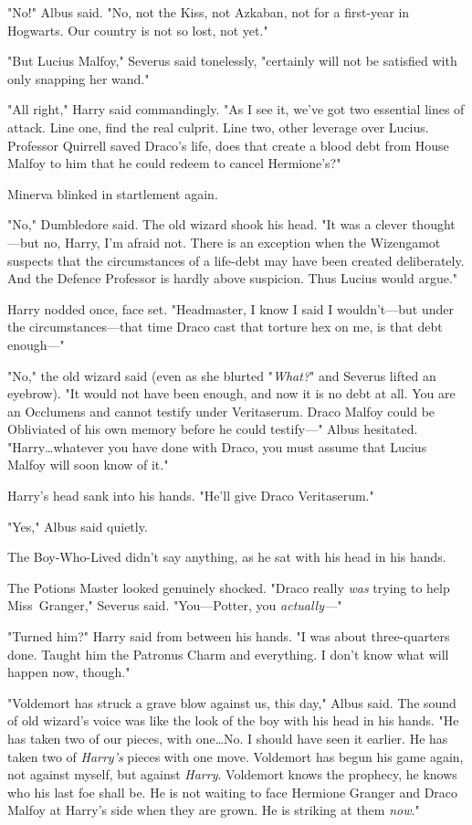 "No!" Albus said. "No, not the Kiss, not Azkaban, not for a first-year in
Hogwarts. Our country is not so lost, not yet."

"But Lucius Malfoy," Severus said tonelessly, "certainly will not be satisfied
with only snapping her wand."

"All right," Harry said commandingly. "As I see it, we've got two essential
lines of attack. Line one, find the real culprit. Line two, other leverage over
Lucius. Professor Quirrell saved Draco's life, does that create a blood debt
from House Malfoy to him that he could redeem to cancel Hermione's?"

Minerva blinked in startlement again.

"No," Dumbledore said. The old wizard shook his head. "It was a clever
thought—but no, Harry, I'm afraid not. There is an exception when the
Wizengamot suspects that the circumstances of a life-debt may have been created
deliberately. And the Defence Professor is hardly above suspicion. Thus Lucius
would argue."

Harry nodded once, face set. "Headmaster, I know I said I wouldn't—but under
the circumstances—that time Draco cast that torture hex on me, is that debt
enough—"

"No," the old wizard said (even as she blurted "\emph{What?}" and Severus
lifted an eyebrow). "It would not have been enough, and now it is no debt at
all. You are an Occlumens and cannot testify under Veritaserum. Draco Malfoy
could be Obliviated of his own memory before he could testify—" Albus
hesitated. "Harry…whatever you have done with Draco, you must assume
that Lucius Malfoy will soon know of it."

Harry's head sank into his hands. "He'll give Draco Veritaserum."

"Yes," Albus said quietly.

The Boy-Who-Lived didn't say anything, as he sat with his head in his hands.

The Potions Master looked genuinely shocked. "Draco really \emph{was} trying to
help Miss~Granger," Severus said. "You—Potter, you \emph{actually—}"

"Turned him?" Harry said from between his hands. "I was about three-quarters
done. Taught him the Patronus Charm and everything. I don't know what will
happen now, though."

"Voldemort has struck a grave blow against us, this day," Albus said. The sound
of old wizard's voice was like the look of the boy with his head in his hands.
"He has taken two of our pieces, with one…No. I should have seen it
earlier. He has taken two of \emph{Harry's} pieces with one move. Voldemort has
begun his game again, not against myself, but against \emph{Harry}. Voldemort
knows the prophecy, he knows who his last foe shall be. He is not waiting to
face Hermione Granger and Draco Malfoy at Harry's side when they are grown. He
is striking at them \emph{now}."

